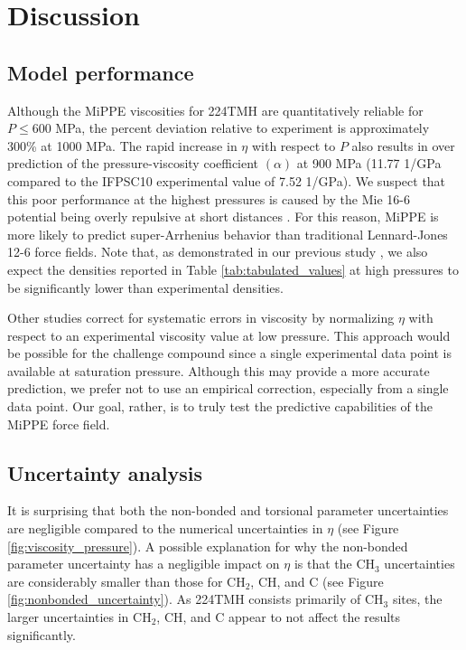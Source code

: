 \documentclass[preprint,review,12pt]{elsarticle}
\begin{document}
    \section{Discussion} \label{Discussion/Limitations}   

    \subsection{Model performance}

    Although the MiPPE viscosities for 224TMH are quantitatively reliable for $P \le 600$ MPa, the percent deviation relative to experiment is approximately 300\% at 1000 MPa. The rapid increase in $\eta$ with respect to $P$ also results in over prediction of the pressure-viscosity coefficient $(\alpha)$ at 900 MPa (11.77 1/GPa compared to the IFPSC10 experimental value of 7.52 1/GPa). We suspect that this poor performance at the highest pressures is caused by the Mie 16-6 potential being overly repulsive at short distances \cite{Postdoc_3,Postdoc_2}. For this reason, MiPPE is more likely to predict super-Arrhenius behavior than traditional Lennard-Jones 12-6 force fields. Note that, as demonstrated in our previous study \cite{Postdoc_2}, we also expect the densities reported in Table \ref{tab:tabulated_values} at high pressures to be significantly lower than experimental densities.

	Other studies \cite{Liu2015} correct for systematic errors in viscosity by normalizing $\eta$ with respect to an experimental viscosity value at low pressure. This approach would be possible for the challenge compound since a single experimental data point is available at saturation pressure. Although this may provide a more accurate prediction, we prefer not to use an empirical correction, especially from a single data point. Our goal, rather, is to truly test the predictive capabilities of the MiPPE force field.

    \subsection{Uncertainty analysis}
    
    It is surprising that both the non-bonded and torsional parameter uncertainties are negligible compared to the numerical uncertainties in $\eta$ (see Figure \ref{fig:viscosity_pressure}). A possible explanation for why the non-bonded parameter uncertainty has a negligible impact on $\eta$ is that the CH$_3$ uncertainties are considerably smaller than those for CH$_2$, CH, and C (see Figure \ref{fig:nonbonded_uncertainty}). As 224TMH consists primarily of CH$_3$ sites, the larger uncertainties in CH$_2$, CH, and C appear to not affect the results significantly. 
    
\end{document}
